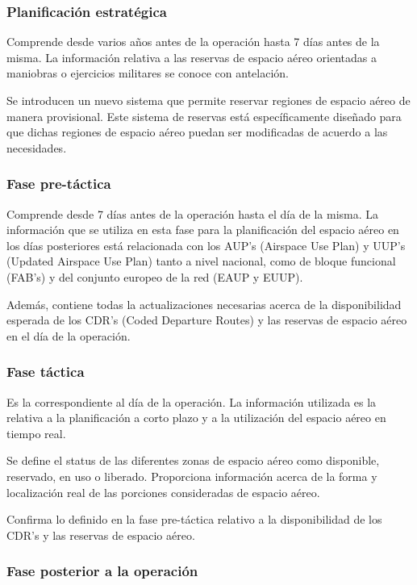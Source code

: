 \subsubsection{Planificación estratégica}\label{tit:level1}

Comprende desde varios años antes de la operación hasta 7 días antes de la misma. La información relativa a las reservas de espacio aéreo orientadas a maniobras o ejercicios militares se conoce con antelación.

Se introducen un nuevo sistema que permite reservar regiones de espacio aéreo de manera provisional. Este sistema de reservas está específicamente diseñado para que dichas regiones de espacio aéreo puedan ser modificadas de acuerdo a las necesidades. 

\subsubsection{Fase pre-táctica}\label{tit:level2}

Comprende desde 7 días antes de la operación hasta el día de la misma. 
La información que se utiliza en esta fase para la planificación del espacio aéreo en los días posteriores está relacionada con los AUP’s (Airspace Use Plan) y UUP’s (Updated Airspace Use Plan) tanto a nivel nacional, como de bloque funcional (FAB’s) y del conjunto europeo de la red (EAUP y EUUP).

Además, contiene todas la actualizaciones necesarias acerca de la disponibilidad esperada de los CDR’s (Coded Departure Routes) y las reservas de espacio aéreo en el día de la operación.

\subsubsection{Fase táctica}\label{tit:level3}

Es la correspondiente al día de la operación.
La información utilizada es la relativa a la planificación a corto plazo y a la utilización del espacio aéreo en tiempo real.

Se define el status de las diferentes zonas de espacio aéreo como disponible, reservado, en uso o liberado. Proporciona información acerca de la forma y localización real de las porciones consideradas de espacio aéreo. 

Confirma lo definido en la fase pre-táctica relativo a la disponibilidad de los CDR’s y las reservas de espacio aéreo.

\subsubsection{Fase posterior a la operación}

